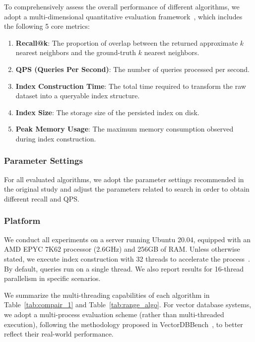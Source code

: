 \documentclass[sigconf, nonacm]{acmart}
\begin{document}
To comprehensively assess the overall performance of different algorithms, we adopt a multi-dimensional quantitative evaluation framework~\cite{compare}, which includes the following 5 core metrics:

\begin{enumerate}

    \item \textbf{Recall@k}: The proportion of overlap between the returned approximate $k$ nearest neighbors and the ground-truth $k$ nearest neighbors.
    \item \textbf{QPS (Queries Per Second)}: The number of queries processed per second.
    \item \textbf{Index Construction Time}: The total time required to transform the raw dataset into a queryable index structure.
    \item \textbf{Index Size}: The storage size of the persisted index on disk.
    \item \textbf{Peak Memory Usage}: The maximum memory consumption observed during index construction.
\end{enumerate}

\subsubsection{Parameter Settings}

For all evaluated algorithms, we adopt the parameter settings recommended in the original study and adjust the parameters related to search in order to obtain different recall and QPS.



\subsubsection{Platform}


We conduct all experiments on a server running Ubuntu 20.04, equipped with an AMD EPYC 7K62 processor (2.6GHz) and 256GB of RAM. Unless otherwise stated, we execute index construction with 32 threads to accelerate the process~\cite{benchmarkindex}. By default, queries run on a single thread. We also report results for 16-thread parallelism in specific scenarios.

We summarize the multi-threading capabilities of each algorithm in Table~\ref{tab:compair_1} and Table~\ref{tab:range_algo}. For vector database systems, we adopt a multi-process evaluation scheme (rather than multi-threaded execution), following the methodology proposed in VectorDBBench~\cite{VectorDBBench}, to better reflect their real-world performance.
\end{document}
